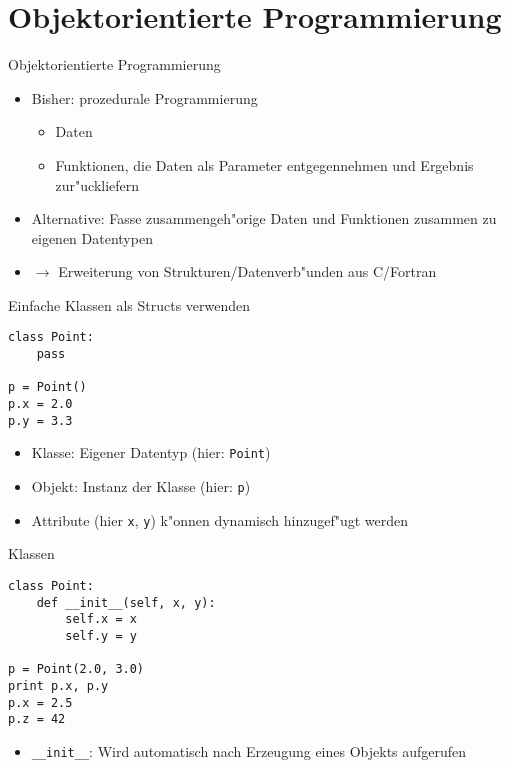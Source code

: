 \section{Objektorientierte Programmierung}

\begin{frame}{Objektorientierte Programmierung}
\begin{itemize}
\item Bisher: \alert{prozedurale Programmierung}
\begin{itemize}
\item Daten
\item Funktionen, die Daten als Parameter entgegennehmen und Ergebnis zur"uckliefern
\end{itemize}
\item Alternative: Fasse zusammengeh"orige Daten und Funktionen zusammen zu \alert{eigenen Datentypen}
\item $\rightarrow$ Erweiterung von Strukturen/Datenverb"unden aus C/Fortran
\end{itemize}
\end{frame}

\begin{frame}[fragile]{Einfache Klassen als Structs verwenden}
\begin{lstlisting}[style=Python]
class Point:
    pass

p = Point()
p.x = 2.0
p.y = 3.3
\end{lstlisting}
\begin{itemize}
\item \alert{Klasse}: Eigener Datentyp (hier: \texttt{Point})
\item \alert{Objekt}: Instanz der Klasse (hier: \texttt{p})
\item Attribute (hier \texttt{x}, \texttt{y})  k"onnen dynamisch hinzugef"ugt werden
\end{itemize}
\end{frame}

\begin{frame}[fragile]{Klassen}
\begin{lstlisting}[style=Python]
class Point:
    def __init__(self, x, y):
        self.x = x
        self.y = y

p = Point(2.0, 3.0)
print p.x, p.y
p.x = 2.5
p.z = 42
\end{lstlisting}
\begin{itemize}
\item \texttt{\_\_init\_\_}: Wird automatisch nach Erzeugung eines Objekts aufgerufen
\end{itemize}
\end{frame}

